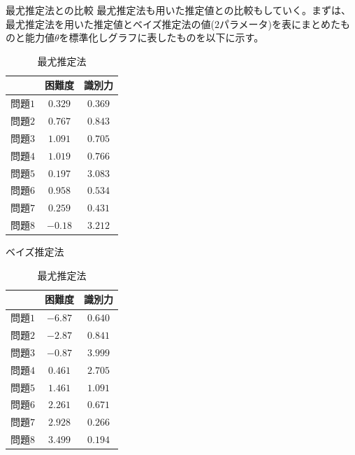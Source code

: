 \documentclass[aspectratio=169, dvipdfmx, 12pt]{beamer}
\begin{document}
\begin{frame}
  \begin{block}{最尤推定法との比較}
    最尤推定法も用いた推定値との比較もしていく。まずは、最尤推定法を用いた推定値とベイズ推定法の値($2$パラメータ)を表にまとめたものと能力値$\theta$を標準化しグラフに表したものを以下に示す。
    \begin{table}[H]
      \begin{minipage}[t]{.45\textwidth}
        \begin{center}
          \begin{tabular}{|l||c|c|} \hline
            & 困難度& 識別力 \\ \hline \hline
            問題$1$ & $0.329$ & $0.369$  \\ \hline
            問題$2$ & $0.767$ & $0.843$  \\ \hline
            問題$3$ & $1.091$ & $0.705$   \\ \hline
            問題$4$ & $1.019$ & $0.766$   \\ \hline
            問題$5$ & $0.197$ & $3.083$   \\ \hline
            問題$6$ & $0.958$ & $0.534$   \\ \hline
            問題$7$ & $0.259$ & $0.431$   \\ \hline
            問題$8$ & $-0.18$ & $3.212$   \\ \hline
          \end{tabular}
        \end{center}
        \caption{ベイズ推定法}
      \end{minipage}
      \begin{minipage}[t]{.45\textwidth}
        \vspace{-2.5cm}
        \begin{center}
          \begin{tabular}{|l||c|c|} \hline
            & 困難度& 識別力 \\ \hline \hline
            問題$1$ & $-6.87$ & $0.640$  \\ \hline
            問題$2$ & $-2.87$ & $0.841$  \\ \hline
            問題$3$ & $-0.87$ & $3.999$   \\ \hline
            問題$4$ & $0.461$ & $2.705$   \\ \hline
            問題$5$ & $1.461$ & $1.091$   \\ \hline
            問題$6$ & $2.261$ & $0.671$   \\ \hline
            問題$7$ & $2.928$ & $0.266$   \\ \hline
            問題$8$ & $3.499$ & $0.194$   \\ \hline
          \end{tabular}
        \end{center}
        \caption{最尤推定法}
      \end{minipage}
    \end{table}
  \end{block}
\end{frame}
\end{document}
